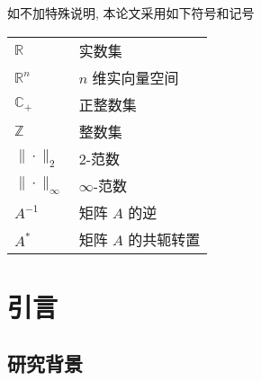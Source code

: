 \documentclass[master,print]{shnuthesis}
\begin{document}

    \maketoc[pagenumtoc]

	\clearpage  %




\begin{symbolpage}

    如不加特殊说明, 本论文采用如下符号和记号

    \begin{table}[htp!]
    \centering
    \renewcommand\arraystretch{1.5} %
    \begin{tabular}{ll}
    $\mathbb{R}$  & 实数集   \\
    $\mathbb{R}^{n}$  & $n$ 维实向量空间   \\
    $\mathbb{C}_{+}$  & 正整数集  \\
    $\mathbb{Z}$  & 整数集  \\
    $\|\cdot\|_2$  & $2$-范数   \\
    $\|\cdot\|_{\infty}$  & $\infty$-范数   \\
    $A^{-1}$  & 矩阵 $A$ 的逆  \\
    $A^{*}$   & 矩阵 $A$ 的共轭转置
    \end{tabular}
    \end{table}

\end{symbolpage}




    \mainmatter



\chapter{引言}

\section{研究背景}
\end{document}
